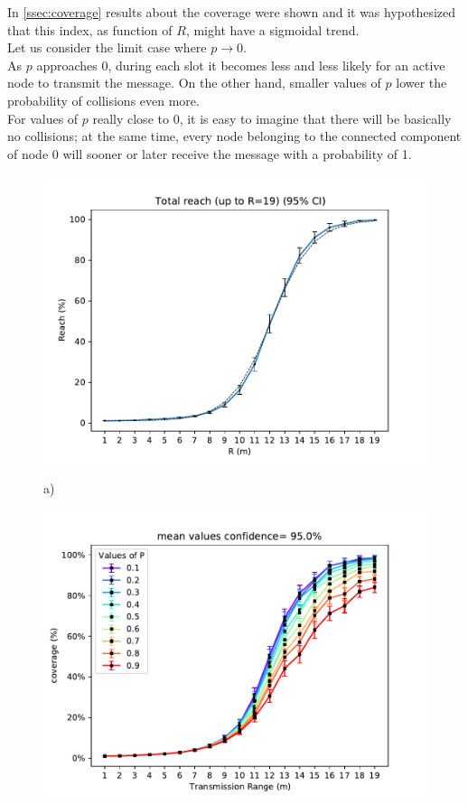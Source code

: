 In \ref{ssec:coverage} results about the coverage were shown and it was hypothesized that this index, as function of $R$, might have a sigmoidal trend.\\
Let us consider the limit case where $p \to 0$.\\
As $p$ approaches 0, during each slot it becomes less and less likely for an active node to transmit the message. On the other hand, smaller values of $p$ lower the probability of collisions even more.\\
For values of $p$ really close to 0, it is easy to imagine that there will be basically no collisions; at the same time, every node belonging to the connected component of node 0 will sooner or later receive the message with a probability of 1.\\
\begin{figure}[H]
	\begin{minipage}{.5\textwidth}
        \includegraphics[scale=.5]{img/graphAnalysisTotal_reachR19.pdf}
        \begin{center}
            a)
        \end{center}
	\end{minipage}
	\begin{minipage}{.5\textwidth} 
		\includegraphics[scale=.5]{img/big_coverage_r_mean_95.0.pdf}

\end{minipage}
\end{figure}

